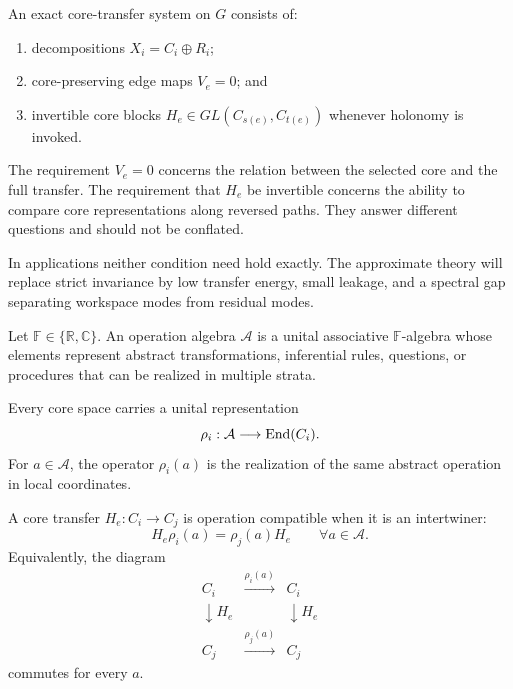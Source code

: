 
\begin{definition}\label{def:exact-core-transfer}
An exact core-transfer system on \(G\) consists of:
\begin{enumerate}
\item decompositions \(X_i=C_i\oplus R_i\);
\item core-preserving edge maps \(V_e=0\); and
\item invertible core blocks \(H_e\in GL(C_{s(e)},C_{t(e)})\) whenever
holonomy is invoked.
\end{enumerate}
\end{definition}

The requirement \(V_e=0\) concerns the relation between the selected core and
the full transfer. The requirement that \(H_e\) be invertible concerns the
ability to compare core representations along reversed paths. They answer
different questions and should not be conflated.

\begin{remark}
In applications neither condition need hold exactly. The approximate theory
will replace strict invariance by low transfer energy, small leakage, and a
spectral gap separating workspace modes from residual modes.
\end{remark}


\begin{definition}\label{def:operation-algebra}
Let \(\mathbb F\in\{\mathbb R,\mathbb C\}\). An operation algebra
\(\mathcal A\) is a unital associative \(\mathbb F\)-algebra whose elements
represent abstract transformations, inferential rules, questions, or
procedures that can be realized in multiple strata.
\end{definition}

Every core space carries a unital representation
\[
\rho_i:\mathcal A\longrightarrow\operatorname{End}(C_i).
\]
For \(a\in\mathcal A\), the operator \(\rho_i(a)\) is the realization of the
same abstract operation in local coordinates.

\begin{definition}\label{def:intertwiner}
A core transfer \(H_e:C_i\to C_j\) is operation compatible when it is an
intertwiner:
\[
\boxed{
H_e\rho_i(a)=\rho_j(a)H_e
}
\qquad
\forall a\in\mathcal A.
\]
Equivalently, the diagram
\[
\begin{array}{ccc}
C_i&\xrightarrow{\rho_i(a)}&C_i\\
\downarrow H_e&&\downarrow H_e\\
C_j&\xrightarrow{\rho_j(a)}&C_j
\end{array}
\]
commutes for every \(a\).
\end{definition}

